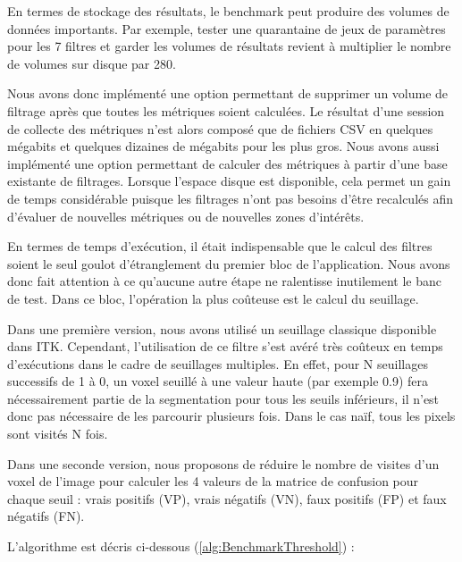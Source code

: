 En termes de stockage des résultats, le benchmark peut produire des volumes de données importants. Par exemple, tester une quarantaine de jeux de paramètres pour les 7 filtres et garder les volumes de résultats revient à multiplier le nombre de volumes sur disque par 280. 

Nous avons donc implémenté une option permettant de supprimer un volume de filtrage après que toutes les métriques soient calculées. Le résultat d'une session de collecte des métriques n'est alors composé que de fichiers CSV en quelques mégabits et quelques dizaines de mégabits pour les plus gros. Nous avons aussi implémenté une option permettant de calculer des métriques à partir d'une base existante de filtrages. Lorsque l'espace disque est disponible, cela permet un gain de temps considérable puisque les filtrages n'ont pas besoins d'être recalculés afin d'évaluer de nouvelles métriques ou de nouvelles zones d'intérêts.

En termes de temps d'exécution, il était indispensable que le calcul des filtres soient le seul goulot d'étranglement du premier bloc de l'application. Nous avons donc fait attention à ce qu'aucune autre étape ne ralentisse inutilement le banc de test. Dans ce bloc, l'opération la plus coûteuse est le calcul du seuillage.

Dans une première version, nous avons utilisé un seuillage classique disponible dans ITK. Cependant, l'utilisation de ce filtre s'est avéré très coûteux en temps d'exécutions dans le cadre de seuillages multiples. En effet, pour N seuillages successifs de 1 à 0, un voxel seuillé à une valeur haute (par exemple 0.9) fera nécessairement partie de la segmentation pour tous les seuils inférieurs, il n'est donc pas nécessaire de les parcourir plusieurs fois. Dans le cas naïf, tous les pixels sont visités N fois.

Dans une seconde version, nous proposons de réduire le nombre de visites d'un voxel de l'image pour calculer les 4 valeurs de la matrice de confusion pour chaque seuil : vrais positifs (VP), vrais négatifs (VN), faux positifs (FP) et faux négatifs (FN).

L'algorithme est décris ci-dessous (\ref{alg:BenchmarkThreshold}) :

